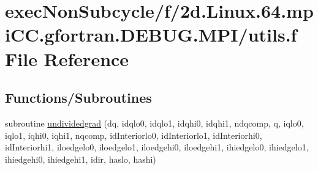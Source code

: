 \hypertarget{utils_8f}{\section{exec\-Non\-Subcycle/f/2d.Linux.64.mpi\-C\-C.\-gfortran.\-D\-E\-B\-U\-G.\-M\-P\-I/utils.f File Reference}
\label{utils_8f}
}
\subsection*{Functions/\-Subroutines}
\begin{DoxyCompactItemize}
\item 
subroutine \hyperlink{utils_8f_a0e8ea5c48873a4a45b37c366fadaec3e}{undividedgrad} (dq, idqlo0, idqlo1, idqhi0, idqhi1, ndqcomp, q, iqlo0, iqlo1, iqhi0, iqhi1, nqcomp, id\-Interiorlo0, id\-Interiorlo1, id\-Interiorhi0, id\-Interiorhi1, iloedgelo0, iloedgelo1, iloedgehi0, iloedgehi1, ihiedgelo0, ihiedgelo1, ihiedgehi0, ihiedgehi1, idir, haslo, hashi)
\end{DoxyCompactItemize}


